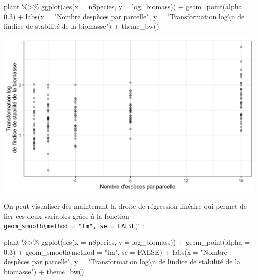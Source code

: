 \documentclass[
  a4paper,
]{article}
\newenvironment{Shaded}{\begin{snugshade}}{\end{snugshade}}
\newcommand{\AttributeTok}[1]{\textcolor[rgb]{0.00,0.34,0.68}{#1}}
\newcommand{\ConstantTok}[1]{\textcolor[rgb]{0.67,0.33,0.00}{#1}}
\newcommand{\FloatTok}[1]{\textcolor[rgb]{0.69,0.50,0.00}{#1}}
\newcommand{\FunctionTok}[1]{\textcolor[rgb]{0.39,0.29,0.61}{#1}}
\newcommand{\NormalTok}[1]{\textcolor[rgb]{0.12,0.11,0.11}{#1}}
\newcommand{\SpecialCharTok}[1]{\textcolor[rgb]{0.24,0.68,0.91}{#1}}
\newcommand{\StringTok}[1]{\textcolor[rgb]{0.75,0.01,0.01}{#1}}
\begin{document}
\begin{Shaded}
\begin{Highlighting}[]
\NormalTok{plant }\SpecialCharTok{\%\textgreater{}\%} 
  \FunctionTok{ggplot}\NormalTok{(}\FunctionTok{aes}\NormalTok{(}\AttributeTok{x =}\NormalTok{ nSpecies, }\AttributeTok{y =}\NormalTok{ log\_biomass)) }\SpecialCharTok{+}
  \FunctionTok{geom\_point}\NormalTok{(}\AttributeTok{alpha =} \FloatTok{0.3}\NormalTok{) }\SpecialCharTok{+}
  \FunctionTok{labs}\NormalTok{(}\AttributeTok{x =} \StringTok{"Nombre d\textquotesingle{}espèces par parcelle"}\NormalTok{,}
       \AttributeTok{y =} \StringTok{"Transformation log}\SpecialCharTok{\textbackslash{}n}\StringTok{ de l\textquotesingle{}indice de stabilité de la biomasse"}\NormalTok{) }\SpecialCharTok{+}
  \FunctionTok{theme\_bw}\NormalTok{()}
\end{Highlighting}
\end{Shaded}

\begin{center}\includegraphics[width=0.9\linewidth]{figure/unnamed-chunk-117-1} \end{center}

On peut visualiser dès maintenant la droite de régression linéaire qui permet de lier ces deux variables grâce à la fonction \texttt{geom\_smooth(method\ =\ "lm",\ se\ =\ FALSE})` :

\begin{Shaded}
\begin{Highlighting}[]
\NormalTok{plant }\SpecialCharTok{\%\textgreater{}\%} 
  \FunctionTok{ggplot}\NormalTok{(}\FunctionTok{aes}\NormalTok{(}\AttributeTok{x =}\NormalTok{ nSpecies, }\AttributeTok{y =}\NormalTok{ log\_biomass)) }\SpecialCharTok{+}
  \FunctionTok{geom\_point}\NormalTok{(}\AttributeTok{alpha =} \FloatTok{0.3}\NormalTok{) }\SpecialCharTok{+}
  \FunctionTok{geom\_smooth}\NormalTok{(}\AttributeTok{method =} \StringTok{"lm"}\NormalTok{, }\AttributeTok{se =} \ConstantTok{FALSE}\NormalTok{) }\SpecialCharTok{+}
  \FunctionTok{labs}\NormalTok{(}\AttributeTok{x =} \StringTok{"Nombre d\textquotesingle{}espèces par parcelle"}\NormalTok{,}
       \AttributeTok{y =} \StringTok{"Transformation log}\SpecialCharTok{\textbackslash{}n}\StringTok{ de l\textquotesingle{}indice de stabilité de la biomasse"}\NormalTok{) }\SpecialCharTok{+}
  \FunctionTok{theme\_bw}\NormalTok{()}
\end{Highlighting}
\end{Shaded}
\end{document}
